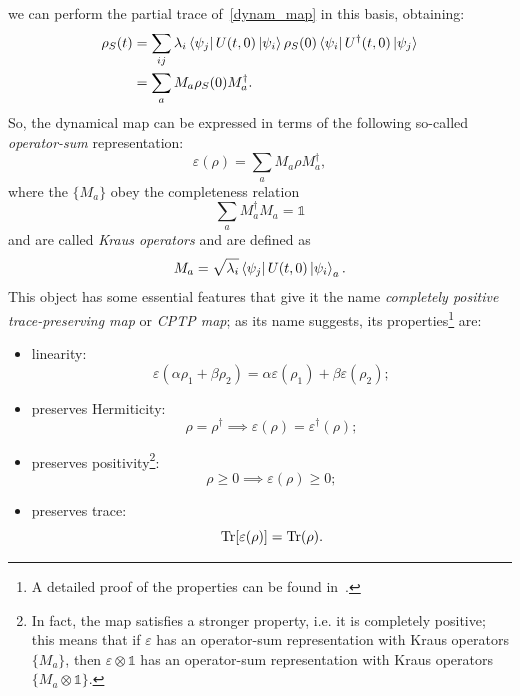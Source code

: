 we can perform the partial trace of~\ref{dynam_map} in this basis, obtaining:
\begin{equation}
\begin{split}
    \rho_S(t) &= \sum_{ij} \lambda_i \bra{\psi_j}U(t,0)\ket{\psi_i}\rho_S(0) \bra{\psi_i}U^\dagger(t,0)\ket{\psi_j}\\
                &= \sum_a M_a \rho_S(0) M_a^\dagger.
\end{split}
\end{equation}
So, the dynamical map can be expressed in terms of the following so-called \emph{operator-sum} representation:
\begin{equation}
    \varepsilon(\rho) = \sum_a M_a \rho M_a^\dagger,
\end{equation}
where the $\{M_a\}$ obey the completeness relation
\begin{equation}
\label{compl_rel_kraus}
    \sum_a M_a^\dagger M_a = \mathds{1}
\end{equation}
and are called \emph{Kraus operators} and are defined as
\begin{equation}
    M_a = \sqrt{\lambda_i} \bra{\psi_j}U(t,0)\ket{\psi_i}_a.
\end{equation}
This object has some essential features that give it the name \emph{completely positive trace-preserving map} or \emph{CPTP map}; as its name suggests, its properties\footnote{A detailed proof of the properties can be found in~\cite{presk:quant_info}.} are:
\begin{itemize}
    \item linearity: 
    \begin{equation*}
        \varepsilon(\alpha\rho_1 + \beta\rho_2) = \alpha\varepsilon(\rho_1) + \beta\varepsilon(\rho_2);
    \end{equation*}
    \item preserves Hermiticity: 
    \begin{equation*}
        \rho = \rho^\dagger \implies \varepsilon(\rho) = \varepsilon^\dagger(\rho);
    \end{equation*}
    \item preserves positivity\footnote{In fact, the map satisfies a stronger property, i.e. it is completely positive; this means that if $\varepsilon$ has an operator-sum representation with Kraus operators $\{M_a\}$, then $\varepsilon \otimes \mathds{1}$ has an operator-sum representation with Kraus operators $\{M_a \otimes \mathds{1}\}$.}:
    \begin{equation*}
        \rho \geq 0 \implies \varepsilon(\rho) \geq 0;
    \end{equation*}
    \item preserves trace:
    \begin{equation*}
        \operatorname{Tr} [\varepsilon(\rho)] = \operatorname{Tr} (\rho).
    \end{equation*}
\end{itemize}

